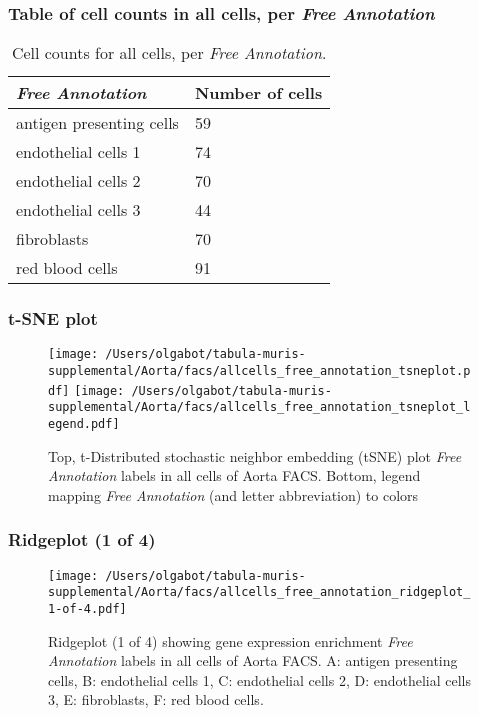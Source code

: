 \subsubsection{Table of cell counts in all cells, per \emph{Free Annotation}}\begin{table}[h]
\centering
\label{my-label}
\begin{tabular}{@{}ll@{}}
\toprule

\emph{Free Annotation}& Number of cells \\ \midrule
antigen presenting cells & 59 \\

endothelial cells 1 & 74 \\

endothelial cells 2 & 70 \\

endothelial cells 3 & 44 \\

fibroblasts & 70 \\

red blood cells & 91 \\
\bottomrule
\end{tabular}
\caption{Cell counts for all cells, per \emph{Free Annotation}.}
\end{table}

\clearpage
\subsubsection{t-SNE plot}
\begin{figure}[h]
\centering
\texttt{[image: /Users/olgabot/tabula-muris-supplemental/Aorta/facs/allcells\_free\_annotation\_tsneplot.pdf]}
\texttt{[image: /Users/olgabot/tabula-muris-supplemental/Aorta/facs/allcells\_free\_annotation\_tsneplot\_legend.pdf]}
\caption{Top, t-Distributed stochastic neighbor embedding (tSNE) plot  \emph{Free Annotation} labels in all cells of Aorta FACS. Bottom, legend mapping \emph{Free Annotation} (and letter abbreviation) to colors}
\end{figure}


\clearpage

\subsubsection{Ridgeplot (1 of 4)}
\begin{figure}[h]
\centering
\texttt{[image: /Users/olgabot/tabula-muris-supplemental/Aorta/facs/allcells\_free\_annotation\_ridgeplot\_1-of-4.pdf]}

\caption{ Ridgeplot (1 of 4)  showing gene expression enrichment \emph{Free Annotation} labels in all cells of Aorta FACS. A: antigen presenting cells, B: endothelial cells 1, C: endothelial cells 2, D: endothelial cells 3, E: fibroblasts, F: red blood cells.}
\end{figure}



